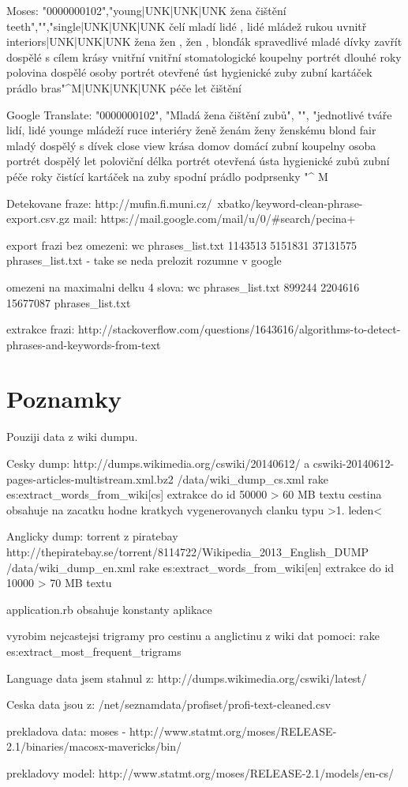 Moses:
"0000000102","young|UNK|UNK|UNK žena čištění teeth","","single|UNK|UNK|UNK čelí mladí lidé , lidé mládež rukou uvnitř interiors|UNK|UNK|UNK žena žen , žen , blonďák spravedlivé mladé dívky zavřít dospělé s cílem krásy vnitřní vnitřní stomatologické koupelny portrét dlouhé roky polovina dospělé osoby portrét otevřené úst hygienické zuby zubní kartáček prádlo bras"^M|UNK|UNK|UNK péče let čištění

Google Translate:
"0000000102", "Mladá žena čištění zubů", "", "jednotlivé tváře lidí, lidé younge mládeží ruce interiéry ženě ženám ženy ženskému blond fair mladý dospělý s dívek close view krása domov domácí zubní koupelny osoba portrét dospělý let poloviční délka portrét otevřená ústa hygienické zubů zubní péče roky čistící kartáček na zuby spodní prádlo podprsenky "^ M


Detekovane fraze:
http://mufin.fi.muni.cz/~xbatko/keyword-clean-phrase-export.csv.gz
mail: https://mail.google.com/mail/u/0/#search/pecina+%


export frazi bez omezeni:
 wc phrases_list.txt 
 1143513 5151831 37131575 phrases_list.txt
- take se neda prelozit rozumne v google

omezeni na maximalni delku 4 slova:
 wc phrases_list.txt
 899244 2204616 15677087 phrases_list.txt


extrakce frazi:
http://stackoverflow.com/questions/1643616/algorithms-to-detect-phrases-and-keywords-from-text


\section{Poznamky}

Pouziji data z wiki dumpu.

Cesky dump:
http://dumps.wikimedia.org/cswiki/20140612/ a cswiki-20140612-pages-articles-multistream.xml.bz2
/data/wiki_dump_cs.xml
rake es:extract_words_from_wiki[cs]
extrakce do id 50000 > 60 MB textu
cestina obsahuje na zacatku hodne kratkych vygenerovanych clanku typu >1. leden<

Anglicky dump:
torrent z piratebay http://thepiratebay.se/torrent/8114722/Wikipedia_2013_English_DUMP
/data/wiki_dump_en.xml
rake es:extract_words_from_wiki[en]
extrakce do id 10000 > 70 MB textu

application.rb obsahuje konstanty aplikace

vyrobim nejcastejsi trigramy pro cestinu a anglictinu z wiki dat pomoci:
rake es:extract_most_frequent_trigrams

Language data jsem stahnul z:
http://dumps.wikimedia.org/cswiki/latest/

Ceska data jsou z:
/net/seznamdata/profiset/profi-text-cleaned.csv

prekladova data:
moses - http://www.statmt.org/moses/RELEASE-2.1/binaries/macosx-mavericks/bin/

prekladovy model:
http://www.statmt.org/moses/RELEASE-2.1/models/en-cs/
